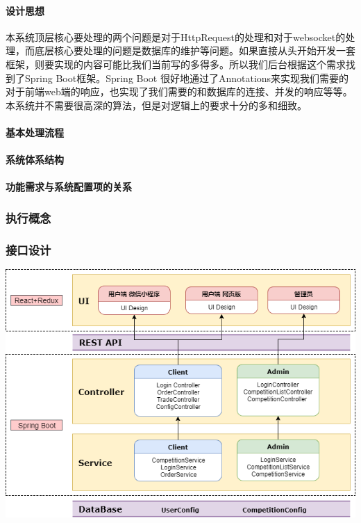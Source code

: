 \documentclass{article}
\begin{document}
				\paragraph{设计思想}
					本系统顶层核心要处理的两个问题是对于HttpRequest的处理和对于websocket的处理，而底层核心要处理的问题是数据库的维护等问题。如果直接从头开始开发一套框架，则要实现的内容可能比我们当前写的多得多。所以我们后台根据这个需求找到了Spring Boot框架。Spring Boot 很好地通过了Annotations来实现我们需要的对于前端web端的响应，也实现了我们需要的和数据库的连接、并发的响应等等。本系统并不需要很高深的算法，但是对逻辑上的要求十分的多和细致。
				\paragraph{基本处理流程}
				\paragraph{系统体系结构}
				\paragraph{功能需求与系统配置项的关系}
			\subsubsection{执行概念}
			\subsubsection{接口设计}
				\includegraphics[scale = .3]{架构图.png}
\end{document}
